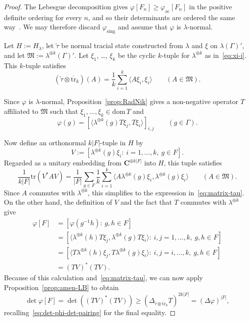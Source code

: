\documentclass[12pt,a4paper]{article}
\numberwithin{equation}{section}
\theoremstyle{remark}
\renewcommand{\rm}[1]{\mathrm{#1}}
\newcommand{\bbC}{\mathbf{C}}
\newcommand{\M}{\mathfrak{M}}
\newcommand{\G}{\Gamma}
\renewcommand{\phi}{\varphi}
\renewcommand{\l}{\lambda}
\renewcommand{\t}[1]{\widetilde{#1}}
\newcommand{\dom}{\mathrm{dom}\,}
\newcommand{\tr}{\overline{\mathrm{tr}}}
\newcommand{\Tr}{\mathrm{tr}}
\begin{document}
\begin{proof}
The Lebesgue decomposition gives $\phi[F_n] \ge \phi_{\rm{ac}}[F_n]$ in the positive definite ordering for every $n$, and so their determinants are ordered the same way~\cite[Corollary 7.7.4(e)]{HorJohMA}.  We may therefore discard $\phi_{\rm{sing}}$ and assume that $\phi$ is $\l$-normal.

Let $H := H_\l$, let $\t{\tau}$ be normal tracial state constructed from $\l$ and $\xi$ on $\l(\G)'$, and let $\M := \l^{\oplus k}(\G)'$.  Let $\xi_1$, \dots, $\xi_k$ be the cyclic $k$-tuple for $\l^{\oplus k}$ as in~\eqref{eq:xi-i}. This $k$-tuple satisfies
\begin{equation}\label{eq:matrix-tau}
(\t{\tau}\otimes \tr_k)(A) = \frac{1}{k}\sum_{i=1}^k\langle A\xi_i,\xi_i\rangle \qquad (A\in \M).
\end{equation}

Since $\phi$ is $\l$-normal, Proposition~\ref{prop:RadNik} gives a non-negative operator $T$ affiliated to $\M$ such that $\xi_1,\dots,\xi_k \in \dom T$ and
\begin{equation}\label{eq:phi-T}
\phi(g) = [\langle \l^{\oplus k}(g)T\xi_j,T\xi_i\rangle]_{i,j} \qquad (g \in \G).
\end{equation}

Now define an orthonormal $k|F|$-tuple in $H$ by
\[V := [\l^{\oplus k}(g)\xi_i:\ i=1,\dots,k,\ g \in F].\]
Regarded as a unitary embedding from $\bbC^{\oplus k|F|}$ into $H$, this tuple satisfies
\[\frac{1}{k|F|}\Tr(V^\ast A V) = \frac{1}{|F|}\sum_{g \in F}\frac{1}{k}\sum_{i=1}^k \langle A\l^{\oplus k}(g)\xi_i,\l^{\oplus k}(g)\xi_i\rangle \qquad (A \in \M).\]
Since $A$ commutes with $\l^{\oplus k}$, this simplifies to the expression in~\eqref{eq:matrix-tau}.  On the other hand, the definition of $V$ and the fact that $T$ commutes with $\l^{\oplus k}$ give
\begin{align*}
\phi[F] &= [\phi(g^{-1}h):\ g,h \in F] \\
&= [\langle\l^{\oplus k}(h)T\xi_j,\l^{\oplus k}(g)T\xi_i\rangle:\ i,j=1,\dots,k,\ g,h \in F] \\
&= [\langle T\l^{\oplus k}(h)\xi_j,T\l^{\oplus k}(g)\xi_i\rangle:\ i,j=i,\dots,k,\ g,h \in F] \\
&=(TV)^\ast (TV).
\end{align*}
Because of this calculation and~\eqref{eq:matrix-tau}, we can now apply Proposition~\ref{prop:amen-LB} to obtain
\[\det \phi[F] = \det ((TV)^\ast (TV)) \ge (\Delta_{\t{\tau}\otimes \tr_k}T)^{2k|F|} = (\Delta \phi)^{|F|},\]
recalling~\eqref{eq:det-phi-det-pairing} for the final equality.
\end{proof}
\end{document}
